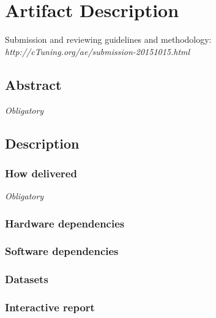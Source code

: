 \documentclass{sigplanconf}
\begin{document}



\appendix
\section{Artifact Description}

Submission and reviewing guidelines and methodology: \\
{\em http://cTuning.org/ae/submission-20151015.html}

\subsection{Abstract}

{\em Obligatory}

\subsection{Description}
\subsubsection{How delivered}

{\em Obligatory}

\subsubsection{Hardware dependencies}

\subsubsection{Software dependencies}

\subsubsection{Datasets}

\subsubsection{Interactive report}
\end{document}
